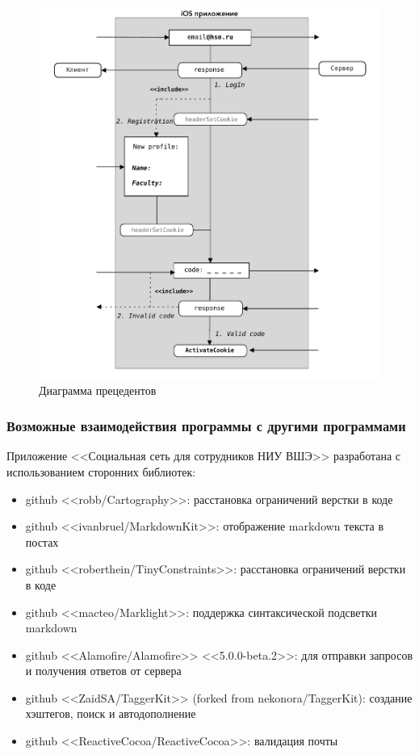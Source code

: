 \documentclass[a4paper,12pt]{article}
\begin{document}
	\begin{figure}[h!]
		\centering
		\includegraphics[width = \linewidth]{../includes/illustrations/AuthP.pdf}
		\caption{Диаграмма прецедентов}
		\label{pic: authP}
	\end{figure}
	\clearpage	
	\subsubsection{Возможные взаимодействия программы с другими программами}
	
	Приложение <<Социальная сеть для сотрудников НИУ ВШЭ>> разработана с использованием сторонних библиотек: 
	\begin{itemize}
		\item github <<robb/Cartography>>: расстановка ограничений верстки в коде
		\item github <<ivanbruel/MarkdownKit>>: отображение markdown текста в постах
		\item github <<roberthein/TinyConstraints>>: расстановка ограничений верстки в коде
		\item github <<macteo/Marklight>>: поддержка синтаксической подсветки markdown
		\item github <<Alamofire/Alamofire>> <<5.0.0-beta.2>>: для отправки запросов и получения ответов от сервера
		\item github <<ZaidSA/TaggerKit>> (forked from nekonora/TaggerKit): создание хэштегов, поиск и автодополнение
		\item github <<ReactiveCocoa/ReactiveCocoa>>: валидация почты 
	\end{itemize}
\end{document}
